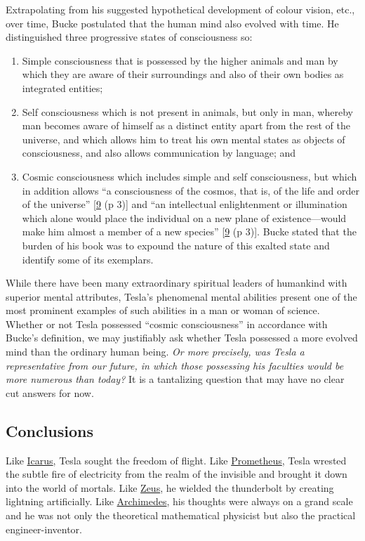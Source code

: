 \documentclass[
  a4paper,
]{article}
\begin{document}
Extrapolating from his suggested hypothetical development of colour
vision, etc., over time, Bucke postulated that the human mind also
evolved with time. He distinguished three progressive states of
consciousness so:

\begin{enumerate}
\item
  Simple consciousness that is possessed by the higher animals and man
  by which they are aware of their surroundings and also of their own
  bodies as integrated entities;
\item
  Self consciousness which is not present in animals, but only in man,
  whereby man becomes aware of himself as a distinct entity apart from
  the rest of the universe, and which allows him to treat his own mental
  states as objects of consciousness, and also allows communication by
  language; and
\item
  Cosmic consciousness which includes simple and self consciousness, but
  which in addition allows ``a consciousness of the cosmos, that is, of
  the life and order of the universe''
  {[}\protect\hyperlink{ref-bucke48}{9} (p 3){]} and ``an intellectual
  enlightenment or illumination which alone would place the individual
  on a new plane of existence---would make him almost a member of a new
  species'' {[}\protect\hyperlink{ref-bucke48}{9} (p 3){]}. Bucke stated
  that the burden of his book was to expound the nature of this exalted
  state and identify some of its exemplars.
\end{enumerate}

While there have been many extraordinary spiritual leaders of humankind
with superior mental attributes, Tesla's phenomenal mental abilities
present one of the most prominent examples of such abilities in a man or
woman of science. Whether or not Tesla possessed ``cosmic
consciousness'' in accordance with Bucke's definition, we may
justifiably ask whether Tesla possessed a more evolved mind than the
ordinary human being. \emph{Or more precisely, was Tesla a
representative from our future, in which those possessing his faculties
would be more numerous than today?} It is a tantalizing question that
may have no clear cut answers for now.

\hypertarget{conclusions}{%
\subsection{Conclusions}\label{conclusions}}

Like \href{https://en.wikipedia.org/wiki/Icarus}{Icarus}, Tesla sought
the freedom of flight. Like
\href{https://en.wikipedia.org/wiki/Prometheus}{Prometheus}, Tesla
wrested the subtle fire of electricity from the realm of the invisible
and brought it down into the world of mortals. Like
\href{https://en.wikipedia.org/wiki/Zeus}{Zeus}, he wielded the
thunderbolt by creating lightning artificially. Like
\href{https://en.wikipedia.org/wiki/Archimedes}{Archimedes}, his
thoughts were always on a grand scale and he was not only the
theoretical mathematical physicist but also the practical
engineer-inventor.
\end{document}

